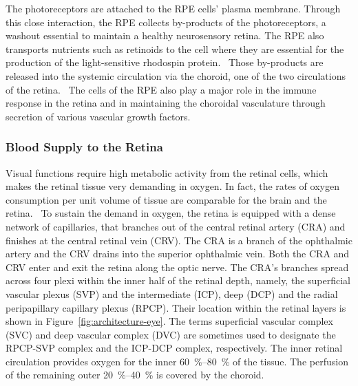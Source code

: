 \documentclass[12pt,a4paper]{journal}
\begin{document}
The photoreceptors are attached to the RPE cells' plasma membrane.
Through this close interaction, the RPE collects by-products of the photoreceptors, a washout essential to maintain a healthy neurosensory retina.
The RPE also transports nutrients such as retinoids to the cell where they are essential for the production of the light-sensitive rhodospin protein.~\cite{Boulton_2001} 
Those by-products are released into the systemic circulation via the choroid, one of the two circulations of the retina.~\cite{Boulton_2001}
The cells of the RPE also play a major role in the immune response in the retina and in maintaining the choroidal vasculature through secretion of various vascular growth factors.~\cite{Boulton_2001,Detrick_2020} 

\subsubsection*{Blood Supply to the Retina}

Visual functions require high metabolic activity from the retinal cells, which makes the retinal tissue very demanding in oxygen.
In fact, the rates of oxygen consumption per unit volume of tissue are comparable for the brain and the retina.~\cite{Medrano_1995}
To sustain the demand in oxygen, the retina is equipped with a dense network of capillaries, that branches out of the central retinal artery (CRA) and finishes at the central retinal vein (CRV).
The CRA is a branch of the ophthalmic artery and the CRV drains into the superior ophthalmic vein.
Both the CRA and CRV enter and exit the retina along the optic nerve.
The CRA's branches spread across four plexi within the inner half of the retinal depth, namely, the superficial vascular plexus (SVP) and the intermediate (ICP), deep (DCP) and the radial peripapillary capillary plexus (RPCP).
Their location within the retinal layers is shown in Figure~\ref{fig:architecture-eye}.
The terms superficial vascular complex (SVC) and deep vascular complex (DVC) are sometimes used to designate the RPCP-SVP complex and the ICP-DCP complex, respectively.
The inner retinal circulation provides oxygen for the inner \SIrange{60}{80}{\percent} of the tissue.\cite{Birol_2007}
The perfusion of the remaining outer \SIrange{20}{40}{\percent} is covered by the choroid.
\end{document}

